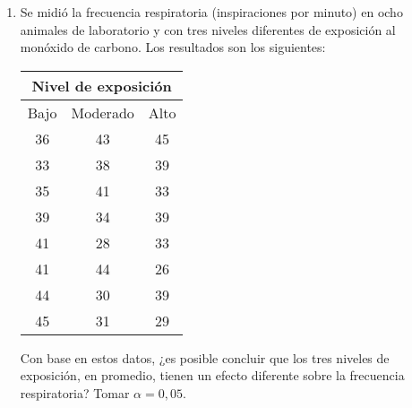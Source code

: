 \begin{enumerate}[leftmargin=*]
\item Se midió la frecuencia respiratoria (inspiraciones por minuto) en ocho animales de laboratorio y con tres niveles
diferentes de exposición al monóxido de carbono. 
Los resultados son los siguientes:
\begin{center}
\begin{tabular}{lll}
\multicolumn{3}{c}{Nivel de exposición} \\
\hline
\multicolumn{1}{c}{Bajo} & \multicolumn{1}{c}{Moderado} & \multicolumn{1}{c}{Alto} \\
\hline
\multicolumn{1}{c}{36} & \multicolumn{1}{c}{43} & \multicolumn{1}{c}{45} \\
\multicolumn{1}{c}{33} & \multicolumn{1}{c}{38} & \multicolumn{1}{c}{39} \\
\multicolumn{1}{c}{35} & \multicolumn{1}{c}{41} & \multicolumn{1}{c}{33} \\
\multicolumn{1}{c}{39} & \multicolumn{1}{c}{34} & \multicolumn{1}{c}{39} \\
\multicolumn{1}{c}{41} & \multicolumn{1}{c}{28} & \multicolumn{1}{c}{33} \\
\multicolumn{1}{c}{41} & \multicolumn{1}{c}{44} & \multicolumn{1}{c}{26} \\
\multicolumn{1}{c}{44} & \multicolumn{1}{c}{30} & \multicolumn{1}{c}{39} \\
\multicolumn{1}{c}{45} & \multicolumn{1}{c}{31} & \multicolumn{1}{c}{29} \\
\hline
\end{tabular}
\end{center}

Con base en estos datos, ¿es posible concluir que los tres niveles de exposición, en promedio, tienen un efecto
diferente sobre la frecuencia respiratoria? 
Tomar $\alpha=0,05$.
\end{enumerate}

